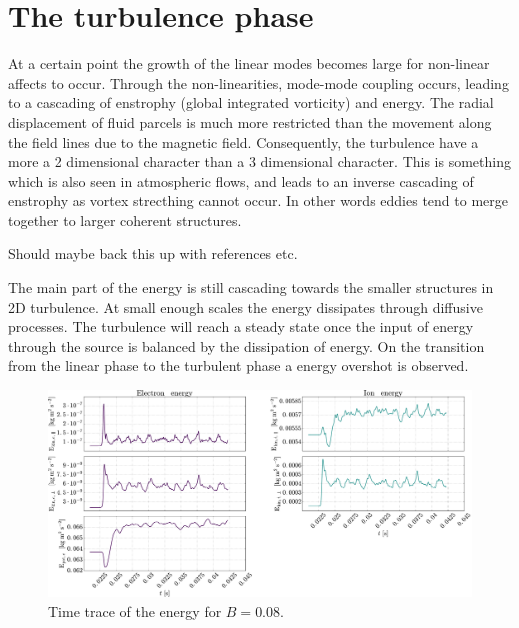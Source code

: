 \section{The turbulence phase}
At a certain point the growth of the linear modes becomes large for non-linear affects to occur.
Through the non-linearities, mode-mode coupling occurs, leading to a cascading of enstrophy (global integrated vorticity) and energy.
The radial displacement of fluid parcels is much more restricted than the movement along the field lines due to the magnetic field.
Consequently, the turbulence have a more a 2 dimensional character than a 3 dimensional character.
This is something which is also seen in atmospheric flows, and leads to an inverse cascading of enstrophy as vortex strecthing cannot occur.
In other words eddies tend to merge together to larger coherent structures.

Should maybe back this up with references etc.

The main part of the energy is still cascading towards the smaller structures in 2D turbulence.
At small enough scales the energy dissipates through diffusive processes.
The turbulence will reach a steady state once the input of energy through the source is balanced by the dissipation of energy.
On the transition from the linear phase to the turbulent phase a energy overshot is observed.
\begin{figure}[htb]
    \centering
    \includegraphics[width=1.0\textwidth]{fig/results/energyTrace/energyTraceB008}
    \caption{Time trace of the energy for $B=0.08$.}
    \label{fig:energyTrace008}
\end{figure}

